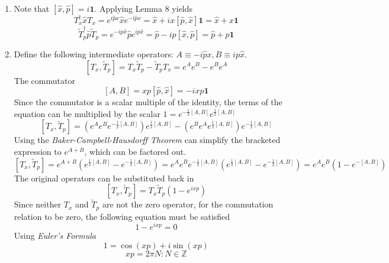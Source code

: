 \begin{sol}
\begin{enumerate}[label=\textbf{(\alph*)}]
\item
Note that $[\hat x,\hat p]=i\mathbf{1}$. Applying Lemma 8 yields
$$T_x^\dagger\hat xT_x=e^{i\hat p x}\hat xe^{-i\hat px}=\hat x+ix[\hat p,\hat x]\mathbf{1}=\hat x+x\mathbf{1}$$
$$\tilde T_p^\dagger\hat p\tilde T_p=e^{-ip\hat x}\hat pe^{ip\hat x}=\hat p-ip[\hat x,\hat p]=\hat p+p\mathbf{1}$$
\item
Define the following intermediate operators: $A\equiv-i\hat p x, B\equiv ip\hat x$.
$$[T_x,\tilde T_p]=T_x\tilde T_p-\tilde T_pT_x=e^{A}e^{B}-e^{B}e^{A}$$
The commutator 
$$[A,B]=xp[\hat p,\hat x]=-ixp\mathbf{1}$$ 
Since the commutator is a scalar multiple of the identity, the terms of the equation can be multiplied by the scalar $1=e^{-\frac{1}{2}[A,B]}e^{\frac{1}{2}[A,B]}$ 
$$[T_x, \tilde T_p]=(e^Ae^Be^{-\frac{1}{2}[A,B]})e^{\frac{1}{2}[A,B]}-(e^Be^Ae^{\frac{1}{2}[A,B]})e^{-\frac{1}{2}[A,B]}$$
Using the \textit{Baker-Campbell-Hausdorff Theorem} can simplify the bracketed expression to $e^{A+B}$, which can be factored out.
$$[T_x, \tilde T_p]=e^{A+B}(e^{\frac{1}{2}[A,B]}-e^{-\frac{1}{2}[A,B]})=e^Ae^Be^{-\frac{1}{2}[A,B]}(e^{\frac{1}{2}[A,B]}-e^{-\frac{1}{2}[A,B]})=e^Ae^B(1-e^{-[A,B]})$$ The original operators can be substituted back in
$$[T_x, \tilde T_p]=T_x\tilde T_p(1-e^{ixp})$$ 
Since neither $T_x$ and $\tilde T_p$ are not the zero operator, for the commutation relation to be zero, the following equation must be satisfied
$$1-e^{ixp}=0$$
Using \textit{Euler's Formula}
$$1=\cos(xp)+i\sin(xp)$$ 
$$xp=2\pi N: N\in\mathbb Z$$ 
\end{enumerate}
\end{sol}